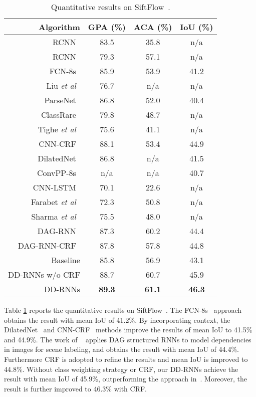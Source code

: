 \documentclass[10pt,twocolumn,letterpaper]{article}
\begin{document}
\renewcommand\arraystretch{1}
\begin{table}[htbp]\small
  \centering
  \caption{Quantitative results on SiftFlow~\cite{liu2011sift}.}
    \begin{tabular}{r|ccc}
    \hline
    Algorithm & GPA (\%) & ACA (\%) & IoU (\%) \\
    \hline
    \hline
    RCNN~\cite{liang2015convolutional}    & 83.5    & 35.8    & n/a \\
    RCNN~\cite{liang2015convolutional}    & 79.3    & 57.1    & n/a \\
    FCN-8s~\cite{long2015fully}  & 85.9    & 53.9    & 41.2 \\
    Liu {\it et al}~\cite{liu2011sift}     & 76.7    & n/a     & n/a \\
    ParseNet~\cite{liu2015parsenet} & 86.8    & 52.0    & 40.4 \\
    ClassRare~\cite{yang2014context} & 79.8    & 48.7    & n/a \\
    Tighe {\it et al}~\cite{tighe2013finding}   & 75.6    & 41.1    & n/a \\
    CNN-CRF~\cite{lin2016efficient} & 88.1    & 53.4    & 44.9 \\
    DilatedNet~\cite{yu2015multi} & 86.8    & n/a     & 41.5 \\
    ConvPP-8s~\cite{xie2016top}  & n/a     & n/a     & 40.7 \\
    CNN-LSTM~\cite{byeon2015scene} & 70.1    & 22.6    & n/a \\
    Farabet {\it et al}~\cite{farabet2013learning}     & 72.3    & 50.8     & n/a \\
    Sharma {\it et al}~\cite{sharma2014recursive}     & 75.5     & 48.0     & n/a \\
    DAG-RNN~\cite{shuai2017scene} & 87.3    & 60.2    & 44.4 \\
    DAG-RNN-CRF~\cite{shuai2017scene} & 87.8    & 57.8    & 44.8 \\
    \hline
    \hline
    Baseline & 85.8    & 56.9    & 43.1 \\
    DD-RNNs w/o CRF    &  88.7    &  60.7    & 45.9 \\
    DD-RNNs    & {\bf 89.3}    & {\bf 61.1}    & {\bf 46.3} \\
    \hline
    \end{tabular}%
  \label{tab:tab3}%
\end{table}%

Table \ref{tab:tab3} reports the quantitative results on SiftFlow~\cite{liu2011sift}. The FCN-8s~\cite{long2015fully} approach obtains the result with mean IoU of 41.2\%. By incorporating context, the DilatedNet~\cite{yu2015multi} and CNN-CRF~\cite{lin2016efficient} methods improve the results of mean IoU to 41.5\% and 44.9\%. The work of ~\cite{shuai2017scene} applies DAG structured RNNs to model dependencies in images for scene labeling, and obtains the result with mean IoU of 44.4\%. Furthermore CRF is adopted to refine the results and mean IoU is improved to 44.8\%. Without class weighting strategy or CRF, our DD-RNNs achieve the result with mean IoU of 45.9\%, outperforming the approach in~\cite{shuai2017scene}. Moreover, the result is further improved to 46.3\% with CRF.
\end{document}
